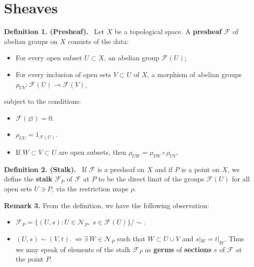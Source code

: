 \documentclass[12pt,a4paper,footinclude=true,headinclude=true]{scrbook} %
\newenvironment{definition}[2][Definition]
    { \begin{mdframed}[backgroundcolor=gray!20] \textbf{#1 #2.}\ }
    {  \end{mdframed}}
\newenvironment{remark}[2][Remark]
    { \begin{mdframed}[backgroundcolor=gray!20] \textbf{#1 #2.} }
    {  \end{mdframed}}
\begin{document}
\section{Sheaves}
\begin{definition}{1. (Presheaf)}
    Let $X$ be a topological space. A \textbf{presheaf} $\mathscr{F}$ of abelian groups on $X$ consists of the data:
    \begin{itemize}
        \item For every open subset $U\subset X$, an abelian group $\mathscr{F}(U)$;
        \item For every inclusion of open sets $V\subset U$ of $X$, a morphism of abelian groups $\rho_{UV}:\mathscr{F}(U)\to\mathscr{F}(V)$,
    \end{itemize}
    subject to the conditions:
    \begin{itemize}
        \item $\mathscr{F}(\varnothing)=0$.
        \item $\rho_{UU}=1_{\mathscr{F}(U)}$.
        \item If $W\subset V\subset U$ are open subsets, then $\rho_{UW}=\rho_{VW}\circ\rho_{UV}$.
    \end{itemize}
\end{definition}

\begin{definition}{2. (Stalk)}
    If $\mathscr{F}$ is a presheaf on $X$ and if $P$ is a point on $X$, we define the \textbf{stalk} $\mathscr{F}_P$ of $\mathscr{F}$ at $P$ to be the direct limit of the groups $\mathscr{F}(U)$ for all open sets $U\ni P$, via the restriction maps $\rho$.
\end{definition}

\begin{remark}{3}
    From the definition, we have the following observation:
    \begin{itemize}
        \item $\mathscr{F}_P=\{(U,s):U\in\mathcal{N}_P,\ s\in\mathscr{F}(U)\}/\sim$.
        \item $(U,s)\sim(V,t).\ \Longleftrightarrow \exists\ W\in\mathcal{N}_P$ such that $W\subset U\cup V$ and $s|_W=t|_W$. Thus we may speak of elements of the stalk $\mathscr{F}_P$ as \textbf{germs} of \textbf{sections} $s$ of $\mathscr{F}$ at the point $P$.
    \end{itemize}
\end{remark}
\end{document}
